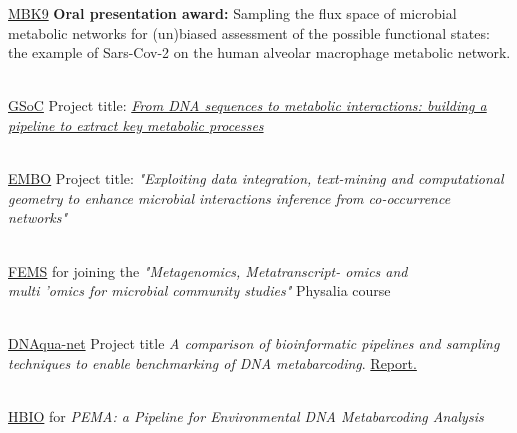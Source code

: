 
    {\href{https://mikrobiokosmos.org/wp-content/uploads/2022/03/9th_mbk_abstract_book_2021.pdf}{MBK9}}
    {
        \textbf{Oral presentation award:}{
        Sampling the flux space of microbial metabolic networks for (un)biased assessment of the possible functional states:
        the example of Sars-Cov-2 on the human alveolar macrophage metabolic network.
    }}{}

    \\[0.2ex]

    {\href{https://summerofcode.withgoogle.com/}{GSoC}}
    {Project title: \textit{\href{https://hariszaf.github.io/gsoc2021/}
    {From DNA sequences to metabolic interactions: building a pipeline to extract key metabolic processes}}}{}

    \\[0.2ex]

    {\href{https://www.embo.org/}{EMBO}}
    {Project title: \textit{"Exploiting data integration, text-mining and computational geometry to enhance microbial interactions inference from  co-occurrence networks"}}{}

    \\[0.2ex]

    {\href{https://fems-microbiology.org/}{FEMS}}
    {for joining the \textit{"Metagenomics, Metatranscript- omics and \\ 
    multi ’omics for microbial community studies"} Physalia course}{}

    \\[0.2ex]
    
    {\href{http://dnaqua.net/}{DNAqua-net}}
    {Project title \textit{A comparison of bioinformatic pipelines and sampling techniques to enable benchmarking of DNA metabarcoding}. \href{http://dnaqua.net/wp-content/uploads/2019/08/Zafeiropoulos.pdf}{Report.}}{}


    \\[0.2ex]
    
    {\href{https://hscbio.wordpress.com/}{HBIO}}
    {for \textit{PEMA: a Pipeline for Environmental DNA Metabarcoding Analysis}}{}